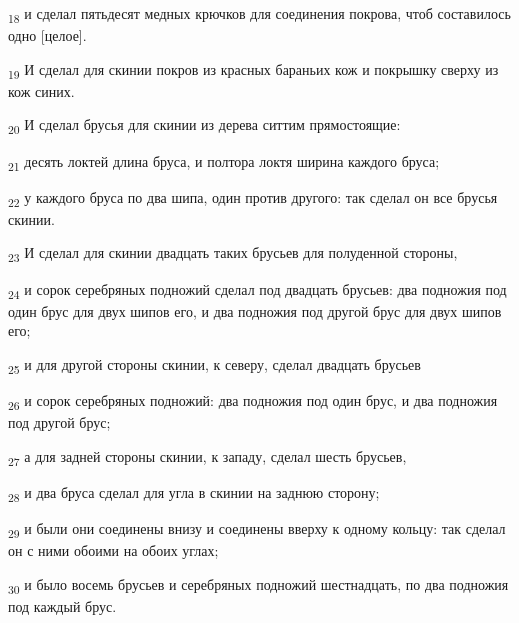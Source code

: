\begin{tcolorbox}
\textsubscript{18} и сделал пятьдесят медных крючков для соединения покрова, чтоб составилось одно [целое].
\end{tcolorbox}
\begin{tcolorbox}
\textsubscript{19} И сделал для скинии покров из красных бараньих кож и покрышку сверху из кож синих.
\end{tcolorbox}
\begin{tcolorbox}
\textsubscript{20} И сделал брусья для скинии из дерева ситтим прямостоящие:
\end{tcolorbox}
\begin{tcolorbox}
\textsubscript{21} десять локтей длина бруса, и полтора локтя ширина каждого бруса;
\end{tcolorbox}
\begin{tcolorbox}
\textsubscript{22} у каждого бруса по два шипа, один против другого: так сделал он все брусья скинии.
\end{tcolorbox}
\begin{tcolorbox}
\textsubscript{23} И сделал для скинии двадцать таких брусьев для полуденной стороны,
\end{tcolorbox}
\begin{tcolorbox}
\textsubscript{24} и сорок серебряных подножий сделал под двадцать брусьев: два подножия под один брус для двух шипов его, и два подножия под другой брус для двух шипов его;
\end{tcolorbox}
\begin{tcolorbox}
\textsubscript{25} и для другой стороны скинии, к северу, сделал двадцать брусьев
\end{tcolorbox}
\begin{tcolorbox}
\textsubscript{26} и сорок серебряных подножий: два подножия под один брус, и два подножия под другой брус;
\end{tcolorbox}
\begin{tcolorbox}
\textsubscript{27} а для задней стороны скинии, к западу, сделал шесть брусьев,
\end{tcolorbox}
\begin{tcolorbox}
\textsubscript{28} и два бруса сделал для угла в скинии на заднюю сторону;
\end{tcolorbox}
\begin{tcolorbox}
\textsubscript{29} и были они соединены внизу и соединены вверху к одному кольцу: так сделал он с ними обоими на обоих углах;
\end{tcolorbox}
\begin{tcolorbox}
\textsubscript{30} и было восемь брусьев и серебряных подножий шестнадцать, по два подножия под каждый брус.
\end{tcolorbox}
